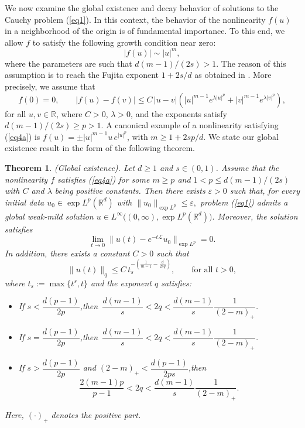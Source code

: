 \documentclass[a4paper,11pt]{amsart}
\renewcommand\eqref[1]{(\ref{#1})} %
\numberwithin{equation}{section}
\theoremstyle{plain}
\newtheorem{theorem}{Theorem}[section]
\theoremstyle{definition}
\begin{document}
We now examine the global existence and decay behavior of solutions to the Cauchy problem \eqref{eq1}. In this context, the behavior of the nonlinearity $f(u)$ in a neighborhood of the origin is of fundamental importance. To this end, we allow $f$ to satisfy the following growth condition near zero:
\[
|f(u)| \sim |u|^m,
\]
where the parameters are such that $d(m-1)/(2s) > 1$. The reason of this assumption is to reach the Fujita exponent $1+2s/d$ as obtained in \cite{KT2026}. More precisely, we assume that
\begin{equation}\label{eq4a}
f(0)=0,\qquad 
|f(u)-f(v)| \leq C\,|u-v|\left(|u|^{m-1}e^{\lambda |u|^p} + |v|^{m-1}e^{\lambda |v|^p}\right),
\end{equation}
for all $u,v \in \mathbb{R}$, where $C>0$, $\lambda>0$, and the exponents satisfy $d(m-1)/(2s) \geq p > 1$. A canonical example of a nonlinearity satisfying \eqref{eq4a} is $f(u)=\pm |u|^{m-1}u\,e^{|u|^p}$, with $m \geq 1+2sp/d$. We state our global existence result in the form of the following theorem.
\begin{theorem}\label{theo2}\textup{(Global existence).} Let $d \ge 1$ and $s\in(0,1)$. 
Assume that the nonlinearity $f$ satisfies \eqref{eq4a} for some $m \ge p$ and
$1 < p \le d(m-1)/(2s)$ with $C$ and $\lambda$ being positive constants.
Then there exists $\varepsilon > 0$ such that, for every initial data 
$u_0 \in \exp L^p(\mathbb{R}^d)$ with $\|u_0\|_{\exp L^p} \le \varepsilon,$ problem \eqref{eq1} admits a global weak-mild solution
$
u \in L^\infty\big((0,\infty), \exp L^p(\mathbb{R}^d)\big).
$
Moreover, the solution satisfies
\begin{equation}\label{eq5}
\lim_{t \to 0}
\|u(t) - e^{-t\mathcal{L}}u_0\|_{\exp L^p} = 0.
\end{equation}
In addition, there exists a constant $C>0$ such that
\begin{equation} \label{decay1.8}
    \|u(t)\|_{q} 
\le C\, t_s^{-(\frac{1}{m-1} - \frac{d}{2s q})},
\qquad \text{for all } t>0,
\end{equation}
where  $t_s:=\max\{t^s,t\}$ and the exponent $q$ satisfies:
\begin{itemize}
\item If $s < \dfrac{d(p-1)}{2p}$,\quad then\, $\dfrac{d(m-1)}{s} < 2q < \dfrac{d(m-1)}{s}\dfrac{1}{(2-m)_+}$.
\item If $s = \dfrac{d(p-1)}{2p}$,\quad then\, $\dfrac{d(m-1)}{s} < 2q < \dfrac{d(m-1)}{s}\dfrac{1}{(2-m)_+}$.
\item If $s > \dfrac{d(p-1)}{2p}$ and $(2-m)_+ < \dfrac{d(p-1)}{2ps}$,\quad then\, $$\dfrac{2(m-1)p}{p-1} < 2q < \dfrac{d(m-1)}{s}\dfrac{1}{(2-m)_+}.$$
\end{itemize}
Here, $(\cdot)_+$ denotes the positive part.
\end{theorem}
\end{document}

